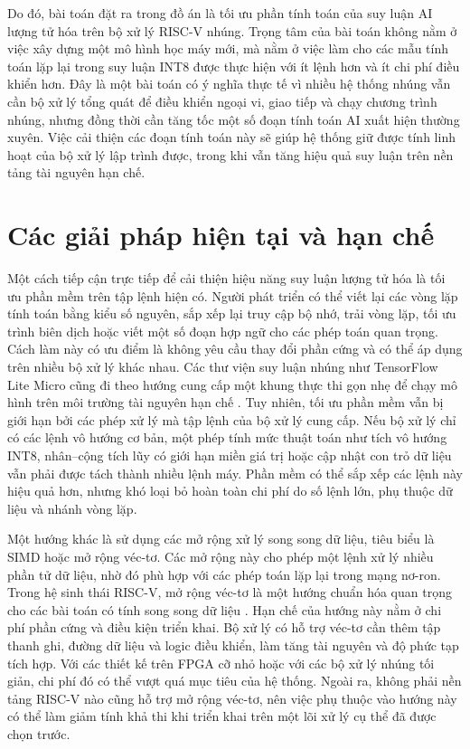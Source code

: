 \documentclass[../DoAn.tex]{subfiles}
\begin{document}
Do đó, bài toán đặt ra trong đồ án là tối ưu phần tính toán của suy luận AI lượng tử hóa trên bộ xử lý RISC-V nhúng. Trọng tâm của bài toán không nằm ở việc xây dựng một mô hình học máy mới, mà nằm ở việc làm cho các mẫu tính toán lặp lại trong suy luận INT8 được thực hiện với ít lệnh hơn và ít chi phí điều khiển hơn. Đây là một bài toán có ý nghĩa thực tế vì nhiều hệ thống nhúng vẫn cần bộ xử lý tổng quát để điều khiển ngoại vi, giao tiếp và chạy chương trình nhúng, nhưng đồng thời cần tăng tốc một số đoạn tính toán AI xuất hiện thường xuyên. Việc cải thiện các đoạn tính toán này sẽ giúp hệ thống giữ được tính linh hoạt của bộ xử lý lập trình được, trong khi vẫn tăng hiệu quả suy luận trên nền tảng tài nguyên hạn chế.

\section{Các giải pháp hiện tại và hạn chế}
\label{sec:giaiphap}

Một cách tiếp cận trực tiếp để cải thiện hiệu năng suy luận lượng tử hóa là tối ưu phần mềm trên tập lệnh hiện có. Người phát triển có thể viết lại các vòng lặp tính toán bằng kiểu số nguyên, sắp xếp lại truy cập bộ nhớ, trải vòng lặp, tối ưu trình biên dịch hoặc viết một số đoạn hợp ngữ cho các phép toán quan trọng. Cách làm này có ưu điểm là không yêu cầu thay đổi phần cứng và có thể áp dụng trên nhiều bộ xử lý khác nhau. Các thư viện suy luận nhúng như TensorFlow Lite Micro cũng đi theo hướng cung cấp một khung thực thi gọn nhẹ để chạy mô hình trên môi trường tài nguyên hạn chế \cite{david2021tflm}. Tuy nhiên, tối ưu phần mềm vẫn bị giới hạn bởi các phép xử lý mà tập lệnh của bộ xử lý cung cấp. Nếu bộ xử lý chỉ có các lệnh vô hướng cơ bản, một phép tính mức thuật toán như tích vô hướng INT8, nhân--cộng tích lũy có giới hạn miền giá trị hoặc cập nhật con trỏ dữ liệu vẫn phải được tách thành nhiều lệnh máy. Phần mềm có thể sắp xếp các lệnh này hiệu quả hơn, nhưng khó loại bỏ hoàn toàn chi phí do số lệnh lớn, phụ thuộc dữ liệu và nhánh vòng lặp.

Một hướng khác là sử dụng các mở rộng xử lý song song dữ liệu, tiêu biểu là SIMD hoặc mở rộng véc-tơ. Các mở rộng này cho phép một lệnh xử lý nhiều phần tử dữ liệu, nhờ đó phù hợp với các phép toán lặp lại trong mạng nơ-ron. Trong hệ sinh thái RISC-V, mở rộng véc-tơ là một hướng chuẩn hóa quan trọng cho các bài toán có tính song song dữ liệu \cite{riscv_unpriv_2026}. Hạn chế của hướng này nằm ở chi phí phần cứng và điều kiện triển khai. Bộ xử lý có hỗ trợ véc-tơ cần thêm tập thanh ghi, đường dữ liệu và logic điều khiển, làm tăng tài nguyên và độ phức tạp tích hợp. Với các thiết kế trên FPGA cỡ nhỏ hoặc với các bộ xử lý nhúng tối giản, chi phí đó có thể vượt quá mục tiêu của hệ thống. Ngoài ra, không phải nền tảng RISC-V nào cũng hỗ trợ mở rộng véc-tơ, nên việc phụ thuộc vào hướng này có thể làm giảm tính khả thi khi triển khai trên một lõi xử lý cụ thể đã được chọn trước.
\end{document}
